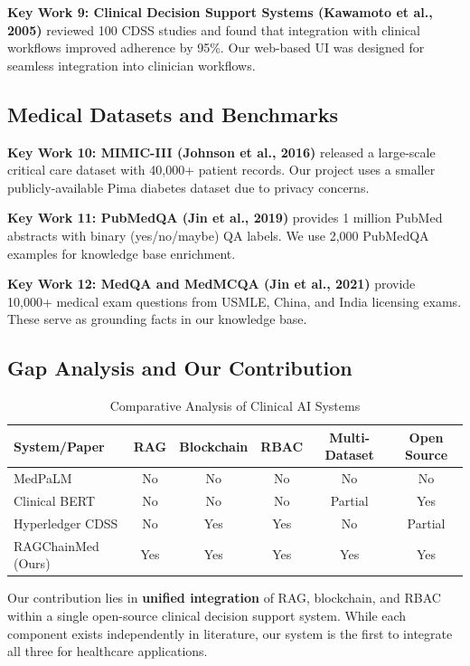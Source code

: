 \documentclass[12pt,singleside,a4paper]{article}
\begin{document}
\textbf{Key Work 9: Clinical Decision Support Systems (Kawamoto et al., 2005)}
\cite{kawamoto2005} reviewed 100 CDSS studies and found that integration with clinical workflows improved adherence by 95\%. Our web-based UI was designed for seamless integration into clinician workflows.

\subsection{Medical Datasets and Benchmarks}

\textbf{Key Work 10: MIMIC-III (Johnson et al., 2016)}
\cite{mimic2016} released a large-scale critical care dataset with 40,000+ patient records. Our project uses a smaller publicly-available Pima diabetes dataset due to privacy concerns.

\textbf{Key Work 11: PubMedQA (Jin et al., 2019)}
\cite{pubmedqa2019} provides 1 million PubMed abstracts with binary (yes/no/maybe) QA labels. We use 2,000 PubMedQA examples for knowledge base enrichment.

\textbf{Key Work 12: MedQA and MedMCQA (Jin et al., 2021)}
\cite{medqa2021} provide 10,000+ medical exam questions from USMLE, China, and India licensing exams. These serve as grounding facts in our knowledge base.

\subsection{Gap Analysis and Our Contribution}

\begin{table}[h]
\centering
\begin{tabular}{|l|c|c|c|c|c|}
\hline
\textbf{System/Paper} & \textbf{RAG} & \textbf{Blockchain} & \textbf{RBAC} & \textbf{Multi-Dataset} & \textbf{Open Source} \\
\hline
MedPaLM & No & No & No & No & No \\
\hline
Clinical BERT & No & No & No & Partial & Yes \\
\hline
Hyperledger CDSS & No & Yes & Yes & No & Partial \\
\hline
RAGChainMed (Ours) & Yes & Yes & Yes & Yes & Yes \\
\hline
\end{tabular}
\caption{Comparative Analysis of Clinical AI Systems}
\end{table}

Our contribution lies in \textbf{unified integration} of RAG, blockchain, and RBAC within a single open-source clinical decision support system. While each component exists independently in literature, our system is the first to integrate all three for healthcare applications.
\end{document}
